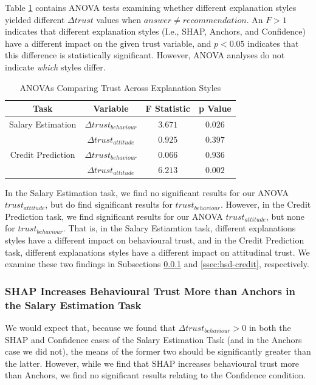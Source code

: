Table \ref{tab:delta-trust-anova} contains ANOVA tests examining whether different explanation styles yielded different $\Delta trust$ values when $answer \neq recommendation$. An $F>1$ indicates that different explanation styles (I.e., SHAP, Anchors, and Confidence) have a different impact on the given trust variable, and $p<0.05$ indicates that this difference is statistically significant. However, ANOVA analyses do not indicate \emph{which} styles differ.

\begin{table}[htbp]
    \caption{ANOVAs Comparing Trust Across Explanation Styles}
    \begin{center}
    \begin{tabular}{cccc}
        \toprule
        Task & Variable & F Statistic & p Value \\
        \midrule
        Salary Estimation & $\Delta trust_{behaviour}$ & $\mathbf{3.671}$ & $\mathbf{0.026}$ \\
        & $\Delta trust_{attitude}$ & $0.925$ & $0.397$ \\
        \midrule
        Credit Prediction & $\Delta trust_{behaviour}$ & $0.066$ & $0.936$ \\
        & $\Delta trust_{attitude}$ & $\mathbf{6.213}$ & $\mathbf{0.002}$ \\
        \bottomrule
    \end{tabular}
    \label{tab:delta-trust-anova}
    \end{center}
\end{table}

In the Salary Estimation task, we find no significant results for our ANOVA $trust_{attitude}$, but do find significant results for $trust_{behaviour}$. However, in the Credit Prediction task, we find significant results for our ANOVA $trust_{attitude}$, but none for $trust_{behaviour}$. That is, in the Salary Estiamtion task, different explanations styles have a different impact on behavioural trust, and in the Credit Prediction task, different explanations styles have a different impact on attitudinal trust. We examine these two findings in Subsections \ref{ssec:hsd-salary} and \ref{ssec:hsd-credit}, respectively.

\subsubsection{SHAP Increases Behavioural Trust More than Anchors in the Salary Estimation Task}\label{ssec:hsd-salary}
We would expect that, because we found that $\Delta trust_{behaviour} > 0$ in both the SHAP and Confidence cases of the Salary Estimation Task (and in the Anchors case we did not), the means of the former two should be significantly greater than the latter. However, while we find that SHAP increases behavioural trust more than Anchors, we find no significant results relating to the Confidence condition.

